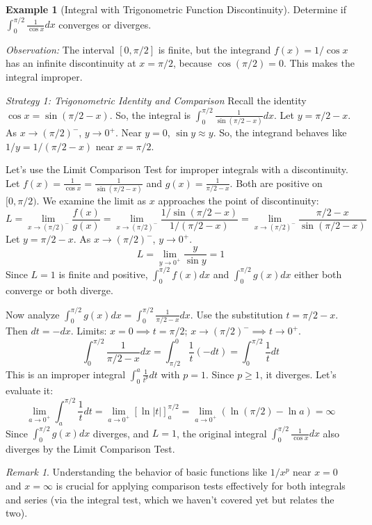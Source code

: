 \documentclass[11pt]{article}
\theoremstyle{definition}
\newtheorem{example}[theorem]{Example}
\theoremstyle{remark}
\newtheorem{remark}[theorem]{Remark}
\begin{document}
\begin{example}[Integral with Trigonometric Function Discontinuity] \label{ex:cos_integral}
Determine if $\int_0^{\pi/2} \frac{1}{\cos x} dx$ converges or diverges.

\textit{Observation:} The interval $[0, \pi/2]$ is finite, but the integrand $f(x) = 1/\cos x$ has an infinite discontinuity at $x = \pi/2$, because $\cos(\pi/2) = 0$. This makes the integral improper.

\textit{Strategy 1: Trigonometric Identity and Comparison}
Recall the identity $\cos x = \sin(\pi/2 - x)$.
So, the integral is $\int_0^{\pi/2} \frac{1}{\sin(\pi/2 - x)} dx$.
Let $y = \pi/2 - x$. As $x \to (\pi/2)^-$, $y \to 0^+$.
Near $y=0$, $\sin y \approx y$. So, the integrand behaves like $1/y = 1/(\pi/2 - x)$ near $x = \pi/2$.

Let's use the Limit Comparison Test for improper integrals with a discontinuity.
Let $f(x) = \frac{1}{\cos x} = \frac{1}{\sin(\pi/2 - x)}$ and $g(x) = \frac{1}{\pi/2 - x}$. Both are positive on $[0, \pi/2)$.
We examine the limit as $x$ approaches the point of discontinuity:
\[ L = \lim_{x \to (\pi/2)^-} \frac{f(x)}{g(x)} = \lim_{x \to (\pi/2)^-} \frac{1/\sin(\pi/2 - x)}{1/(\pi/2 - x)} = \lim_{x \to (\pi/2)^-} \frac{\pi/2 - x}{\sin(\pi/2 - x)} \]
Let $y = \pi/2 - x$. As $x \to (\pi/2)^-$, $y \to 0^+$.
\[ L = \lim_{y \to 0^+} \frac{y}{\sin y} = 1 \]
Since $L=1$ is finite and positive, $\int_0^{\pi/2} f(x) dx$ and $\int_0^{\pi/2} g(x) dx$ either both converge or both diverge.

Now analyze $\int_0^{\pi/2} g(x) dx = \int_0^{\pi/2} \frac{1}{\pi/2 - x} dx$.
Use the substitution $t = \pi/2 - x$. Then $dt = -dx$.
Limits: $x=0 \implies t=\pi/2$; $x \to (\pi/2)^- \implies t \to 0^+$.
\[ \int_0^{\pi/2} \frac{1}{\pi/2 - x} dx = \int_{\pi/2}^0 \frac{1}{t} (-dt) = \int_0^{\pi/2} \frac{1}{t} dt \]
This is an improper integral $\int_0^a \frac{1}{t^p} dt$ with $p=1$. Since $p \ge 1$, it diverges.
Let's evaluate it:
\[ \lim_{a \to 0^+} \int_a^{\pi/2} \frac{1}{t} dt = \lim_{a \to 0^+} [\ln|t|]_a^{\pi/2} = \lim_{a \to 0^+} (\ln(\pi/2) - \ln a) = \infty \]
Since $\int_0^{\pi/2} g(x) dx$ diverges, and $L=1$, the original integral $\int_0^{\pi/2} \frac{1}{\cos x} dx$ also diverges by the Limit Comparison Test.
\end{example}

\begin{remark}
Understanding the behavior of basic functions like $1/x^p$ near $x=0$ and $x=\infty$ is crucial for applying comparison tests effectively for both integrals and series (via the integral test, which we haven't covered yet but relates the two).
\end{remark}
\end{document}
